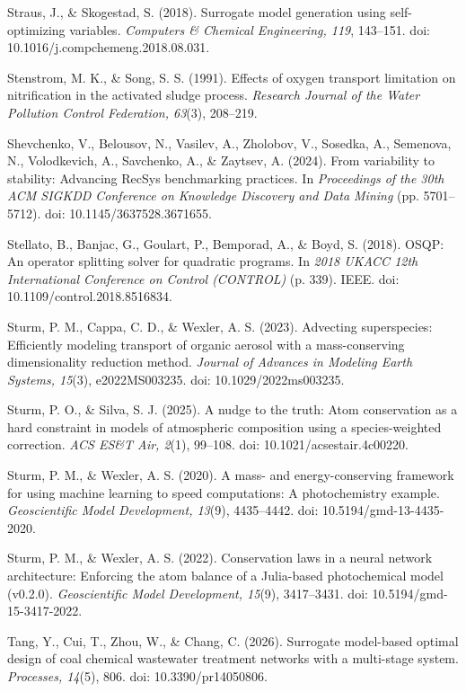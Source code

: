 \documentclass[a4paper,fleqn]{cas-sc}
\begin{document}
\noindent Straus, J., \& Skogestad, S. (2018). Surrogate model generation using self-optimizing variables. \textit{Computers \& Chemical Engineering, 119}, 143--151. doi: 10.1016/j.compchemeng.2018.08.031.

\noindent Stenstrom, M. K., \& Song, S. S. (1991). Effects of oxygen transport limitation on nitrification in the activated sludge process. \textit{Research Journal of the Water Pollution Control Federation, 63}(3), 208--219.

\noindent Shevchenko, V., Belousov, N., Vasilev, A., Zholobov, V., Sosedka, A., Semenova, N., Volodkevich, A., Savchenko, A., \& Zaytsev, A. (2024). From variability to stability: Advancing RecSys benchmarking practices. In \textit{Proceedings of the 30th ACM SIGKDD Conference on Knowledge Discovery and Data Mining} (pp. 5701--5712). doi: 10.1145/3637528.3671655.

\noindent Stellato, B., Banjac, G., Goulart, P., Bemporad, A., \& Boyd, S. (2018). OSQP: An operator splitting solver for quadratic programs. In \textit{2018 UKACC 12th International Conference on Control (CONTROL)} (p. 339). IEEE. doi: 10.1109/control.2018.8516834.

\noindent Sturm, P. M., Cappa, C. D., \& Wexler, A. S. (2023). Advecting superspecies: Efficiently modeling transport of organic aerosol with a mass-conserving dimensionality reduction method. \textit{Journal of Advances in Modeling Earth Systems, 15}(3), e2022MS003235. doi: 10.1029/2022ms003235.

\noindent Sturm, P. O., \& Silva, S. J. (2025). A nudge to the truth: Atom conservation as a hard constraint in models of atmospheric composition using a species-weighted correction. \textit{ACS ES\&T Air, 2}(1), 99--108. doi: 10.1021/acsestair.4c00220.

\noindent Sturm, P. M., \& Wexler, A. S. (2020). A mass- and energy-conserving framework for using machine learning to speed computations: A photochemistry example. \textit{Geoscientific Model Development, 13}(9), 4435--4442. doi: 10.5194/gmd-13-4435-2020.

\noindent Sturm, P. M., \& Wexler, A. S. (2022). Conservation laws in a neural network architecture: Enforcing the atom balance of a Julia-based photochemical model (v0.2.0). \textit{Geoscientific Model Development, 15}(9), 3417--3431. doi: 10.5194/gmd-15-3417-2022.

\noindent Tang, Y., Cui, T., Zhou, W., \& Chang, C. (2026). Surrogate model-based optimal design of coal chemical wastewater treatment networks with a multi-stage system. \textit{Processes, 14}(5), 806. doi: 10.3390/pr14050806.
\end{document}
